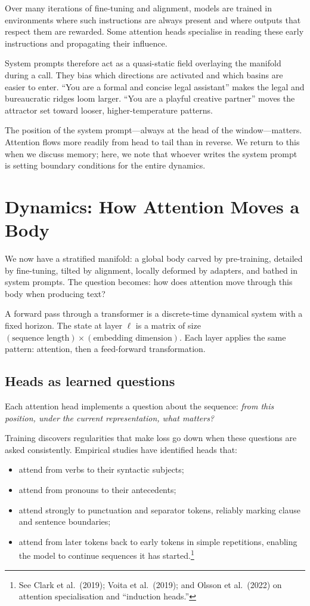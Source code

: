 \documentclass[12pt,a4paper]{book}
\begin{document}
Over many iterations of fine-tuning and alignment, models are trained in environments where such instructions are always present and where outputs that respect them are rewarded. Some attention heads specialise in reading these early instructions and propagating their influence.

System prompts therefore act as a quasi-static field overlaying the manifold during a call. They bias which directions are activated and which basins are easier to enter. ``You are a formal and concise legal assistant'' makes the legal and bureaucratic ridges loom larger. ``You are a playful creative partner'' moves the attractor set toward looser, higher-temperature patterns.

The position of the system prompt---always at the head of the window---matters. Attention flows more readily from head to tail than in reverse. We return to this when we discuss memory; here, we note that whoever writes the system prompt is setting boundary conditions for the entire dynamics.

\section{Dynamics: How Attention Moves a Body}

We now have a stratified manifold: a global body carved by pre-training, detailed by fine-tuning, tilted by alignment, locally deformed by adapters, and bathed in system prompts. The question becomes: how does attention move through this body when producing text?

A forward pass through a transformer is a discrete-time dynamical system with a fixed horizon. The state at layer $\ell$ is a matrix of size $(\text{sequence length}) \times (\text{embedding dimension})$. Each layer applies the same pattern: attention, then a feed-forward transformation.

\subsection*{Heads as learned questions}

Each attention head implements a question about the sequence: \emph{from this position, under the current representation, what matters?}

Training discovers regularities that make loss go down when these questions are asked consistently. Empirical studies have identified heads that:

\begin{itemize}
  \item attend from verbs to their syntactic subjects;
  \item attend from pronouns to their antecedents;
  \item attend strongly to punctuation and separator tokens, reliably marking clause and sentence boundaries;
  \item attend from later tokens back to early tokens in simple repetitions, enabling the model to continue sequences it has started.\footnote{See Clark et al.\ (2019); Voita et al.\ (2019); and Olsson et al.\ (2022) on attention specialisation and ``induction heads.''}
\end{itemize}
\end{document}
